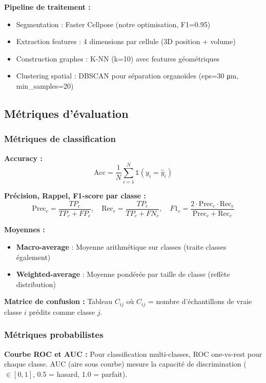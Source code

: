 \textbf{Pipeline de traitement :}
\begin{itemize}
    \item Segmentation : Faster Cellpose (notre optimisation, F1=0.95)
    \item Extraction features : 4 dimensions par cellule (3D position + volume)
    \item Construction graphes : K-NN (k=10) avec features géométriques
    \item Clustering spatial : DBSCAN pour séparation organoïdes (eps=30 μm, min\_samples=20)
\end{itemize}

\subsection{Métriques d'évaluation}

\subsubsection{Métriques de classification}

\textbf{Accuracy :}
\[
\text{Acc} = \frac{1}{N}\sum_{i=1}^N \mathbb{1}(y_i = \hat{y}_i)
\]

\textbf{Précision, Rappel, F1-score par classe :}
\[
\text{Prec}_c = \frac{TP_c}{TP_c + FP_c}, \quad \text{Rec}_c = \frac{TP_c}{TP_c + FN_c}, \quad F1_c = \frac{2 \cdot \text{Prec}_c \cdot \text{Rec}_c}{\text{Prec}_c + \text{Rec}_c}
\]

\textbf{Moyennes :}
\begin{itemize}
    \item \textbf{Macro-average} : Moyenne arithmétique sur classes (traite classes également)
    \item \textbf{Weighted-average} : Moyenne pondérée par taille de classe (reflète distribution)
\end{itemize}

\textbf{Matrice de confusion :}
Tableau $C_{ij}$ où $C_{ij}$ = nombre d'échantillons de vraie classe $i$ prédits comme classe $j$.

\subsubsection{Métriques probabilistes}

\textbf{Courbe ROC et AUC :}
Pour classification multi-classes, ROC one-vs-rest pour chaque classe. AUC (aire sous courbe) mesure la capacité de discrimination ($\in [0,1]$, 0.5 = hasard, 1.0 = parfait).

